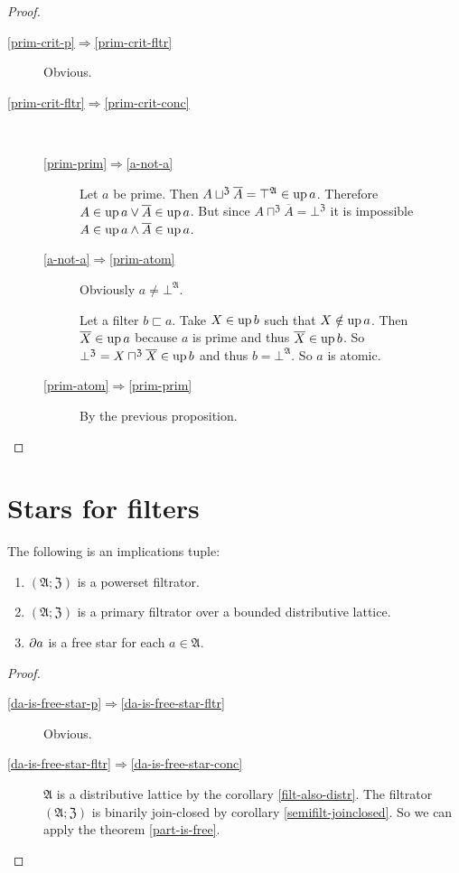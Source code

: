 \begin{proof}
~
\begin{description}
\item [{\ref{prim-crit-p}$\Rightarrow$\ref{prim-crit-fltr}}] Obvious.
\item [{\ref{prim-crit-fltr}$\Rightarrow$\ref{prim-crit-conc}}] ~

\begin{description}
\item [{\ref{prim-prim}$\Rightarrow$\ref{a-not-a}}] Let $a$ be prime.
Then $A\sqcup^{\mathfrak{Z}}\overline{A}=\top^{\mathfrak{A}}\in\operatorname{up} a$.
Therefore $A\in\operatorname{up} a\lor\overline{A}\in\operatorname{up} a$. But since $A\sqcap^{\mathfrak{Z}}\overline{A}=\bot^{\mathfrak{Z}}$
it is impossible $A\in\operatorname{up} a\land\overline{A}\in\operatorname{up} a$.
\item [{\ref{a-not-a}$\Rightarrow$\ref{prim-atom}}] Obviously $a\ne\bot^{\mathfrak{A}}$.

Let a filter $b\sqsubset a$. Take $X\in\operatorname{up} b$ such that $X\notin\operatorname{up} a$. Then $\overline{X}\in\operatorname{up} a$ because $a$ is prime and thus
$\overline{X}\in\operatorname{up} b$. So 
$\bot^{\mathfrak{Z}}=X\sqcap^{\mathfrak{Z}}\overline{X}\in\operatorname{up} b$
and thus $b=\bot^{\mathfrak{A}}$. So $a$ is atomic.
\item [{\ref{prim-atom}$\Rightarrow$\ref{prim-prim}}] By the previous
proposition.
\end{description}
\end{description}
\end{proof}

\section{Stars for filters}
\begin{thm}
\label{da-is-free-star}The following is an implications tuple:
\begin{enumerate}
\item \label{da-is-free-star-p}$(\mathfrak{A};\mathfrak{Z})$ is a powerset
filtrator.
\item \label{da-is-free-star-fltr}$(\mathfrak{A};\mathfrak{Z})$ is a primary
filtrator over a bounded distributive lattice.
\item \label{da-is-free-star-conc}$\partial a$ is a free star for each
$a\in\mathfrak{A}$.
\end{enumerate}
\end{thm}
\begin{proof}
~
\begin{description}
\item [{\ref{da-is-free-star-p}$\Rightarrow$\ref{da-is-free-star-fltr}}] Obvious.
\item [{\ref{da-is-free-star-fltr}$\Rightarrow$\ref{da-is-free-star-conc}}] $\mathfrak{A}$
is a distributive lattice by the corollary \ref{filt-also-distr}.
The filtrator $(\mathfrak{A};\mathfrak{Z})$ is binarily join-closed
by corollary \ref{semifilt-joinclosed}. So we can apply the theorem
\ref{part-is-free}.
\end{description}
\end{proof}

